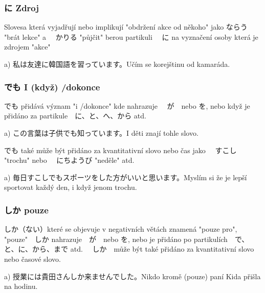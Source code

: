 \subsubsection{に Zdroj}
Slovesa která vyjadřují nebo implikují "obdržení akce od někoho" jako ならう "brát lekce" a 　かりる "půjčit" berou partikuli 　に na vyznačení osoby která je zdrojem "akce"

a) 私は友達に韓国語を習っています。Učím se korejštinu od kamaráda.

\subsubsection{でも I (když) /dokonce}
でも přidává význam "i /dokonce" kde nahrazuje 　が　nebo を, nebo když je přidáno za partikule　に、と、へ、から atd.

a) この言葉は子供でも知っています。I děti znají tohle slovo.

でも také může být přidáno za kvantitativní slovo nebo čas jako 　すこし "trochu" nebo 　にちようび "neděle" atd.

a) 毎日すこしでもスポーツをした方がいいと思います。Myslím si že je lepší sportovat každý den, i když jenom trochu.

\subsubsection{しか pouze}

しか（ない）které se objevuje v negativních větách znamená "pouze pro", "pouze"　しか nahrazuje　が　nebo を, nebo je přidáno po partikulích　で、と、に、から、まで atd. 　しか　může být také přidáno za kvantitativní slovo nebo časové slovo.

a) 授業には貴田さんしか来ませんでした。Nikdo kromě (pouze) paní Kida přišla na hodinu.






































